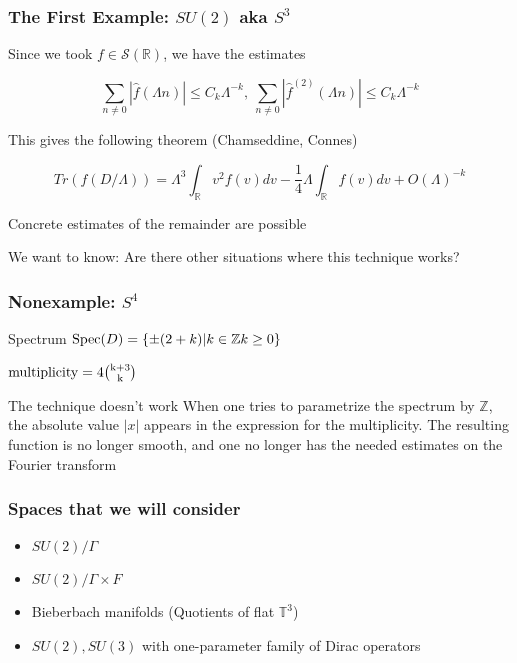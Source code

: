 \documentclass{beamer}
\def\Z{{\mathbb Z}}
\def\R{{\mathbb R}}
\def\cS{{\mathcal S}}
\def\Spec{{\rm Spec}}
\begin{document}
\begin{frame}
  \frametitle{The First Example: $SU(2)$ aka $S^3$}
  \begin{block}{}
    Since we took $f \in \cS (\R)$, we have the estimates

    \[
      \sum_{n \neq 0}|\widehat{f}(\Lambda n)| \leq C_k \Lambda^{-k}, ~ \sum_{n \neq 0}|\widehat{f}^{(2)}(\Lambda n)| \leq C_k \Lambda^{-k}
    \]
  \end{block}

  \pause

  \begin{block}{}
    This gives the following theorem (Chamseddine, Connes)

    \[
      Tr(f(D/\Lambda)) = \Lambda^3 \int_\R v^2 f(v) dv - \frac{1}{4}\Lambda \int_{\R}f(v)dv + O(\Lambda)^{-k}
    \]
  \end{block}

  \pause

  \begin{block}{}
    Concrete estimates of the remainder are possible
  \end{block}
\end{frame}

\begin{frame}
  \begin{block}{}
  We want to know: Are there other situations where this technique works?
  \end{block}
\end{frame}

\begin{frame}
  \frametitle{Nonexample: $S^4$}
  \begin{block}{Spectrum}
    $\Spec(D) = \{\pm (2 + k) | k \in \Z k \geq 0 \}$

    $\rm{multiplicity} = 4 {{k+3} \choose {k}}$
  \end{block}

  \pause

  \begin{alertblock}{The technique doesn't work}
    When one tries to parametrize the spectrum by $\Z$, the absolute value $|x|$ appears in the expression for the multiplicity. The resulting function is no longer smooth, and one no longer has the needed estimates on the Fourier transform
  \end{alertblock}
\end{frame}

\begin{frame}
  \frametitle{Spaces that we will consider}
  \begin{itemize}
    \item $SU(2)/\Gamma$
    \item $SU(2)/\Gamma \times F$
    \item Bieberbach manifolds (Quotients of flat $\mathbb{T} ^3$)
    \item $SU(2), SU(3)$ with one-parameter family of Dirac operators
  \end{itemize}
\end{frame}
\end{document}
